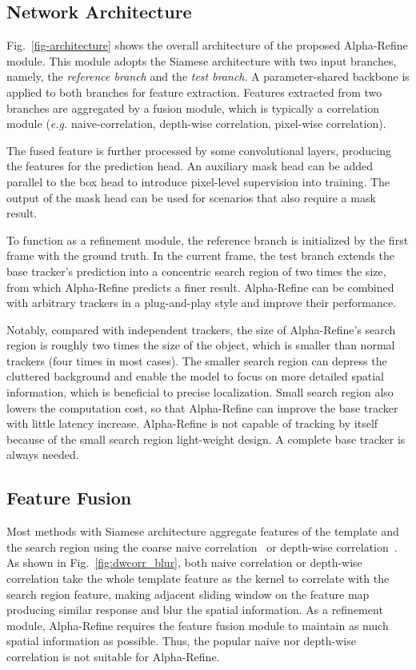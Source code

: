 \documentclass[final]{cvpr}
\begin{document}
\subsection{Network Architecture} 
Fig.~\ref{fig-architecture} shows the overall architecture of the proposed Alpha-Refine module. 
This module adopts the Siamese architecture with two input branches, namely, the \textit{reference branch} 
and the \textit{test branch}. 
A parameter-shared backbone is applied to both branches for feature extraction. Features extracted from 
two branches are aggregated by a fusion module, which is typically a correlation module (\emph{e.g.} 
naive-correlation, depth-wise correlation, pixel-wise correlation). 

The fused feature is further processed by some convolutional layers, producing the features for the prediction head. 
An auxiliary mask head can be added parallel to the box head to introduce pixel-level supervision into training. 
The output of the mask head can be used for scenarios that also require a mask result.

To function as a refinement module, the reference branch is initialized by the first 
frame with the ground truth. 
In the current frame, the test branch extends the base tracker’s prediction into a concentric search region  
of two times the size, from which Alpha-Refine predicts a finer result. 
Alpha-Refine can be combined with arbitrary trackers in a plug-and-play style and improve their performance.

Notably, compared with independent trackers, the size of Alpha-Refine’s search region is roughly two times the size
of the object, which is smaller than normal trackers (four times in most cases). 
The smaller search region can depress the cluttered background and enable the model to focus on more detailed spatial
information, which is beneficial to precise localization.
Small search region also lowers the computation cost, so that Alpha-Refine can improve the base tracker with little
latency increase. 
Alpha-Refine is not capable of tracking by itself because of the small search region light-weight 
design. A complete base tracker is always needed.

\subsection{Feature Fusion}\label{sec:featfuse}
Most methods with Siamese architecture aggregate features of the template and the search region using the coarse naive correlation~\cite{SiameseFC,SiameseRPN,DSiam} or depth-wise correlation~\cite{SiamRPNplus,SiamMask}. 
As shown in Fig.~\ref{fig:dwcorr_blur}, both naive correlation or depth-wise correlation take the whole template feature 
as the kernel to correlate with the search region feature, making adjacent sliding window on the feature map producing 
similar response and blur the spatial information. 
As a refinement module, Alpha-Refine requires the feature fusion module to maintain as much spatial information as possible.
Thus, the popular naive nor depth-wise correlation is not suitable for Alpha-Refine.
\end{document}
